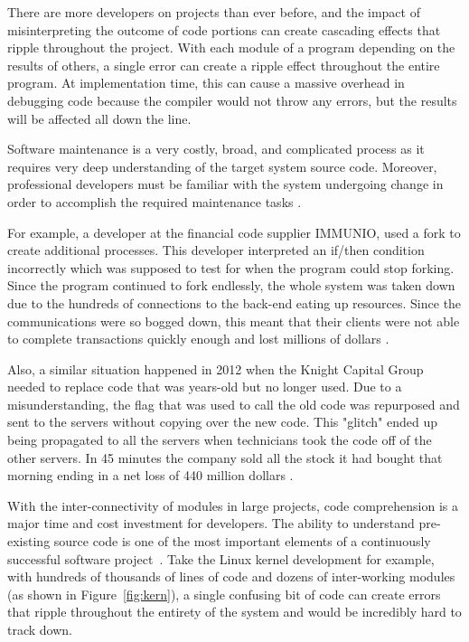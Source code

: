 There are more developers on projects than ever before, and the impact of 
misinterpreting the outcome of code portions can create cascading effects that ripple throughout the project.  With
each module of a program depending on the results of others, a single error can create a ripple effect throughout the entire program.
At implementation time, this can cause a massive overhead in debugging code because the compiler would not 
throw any errors, but the results will be affected all down the line.

Software maintenance is a very costly, broad, and complicated process 
as it requires very deep understanding of the target system source 
code. Moreover, professional
developers must be familiar with the system undergoing change in order to accomplish
the required maintenance tasks \cite{alhindawi_degree_nodate}.

For example, a developer at the financial code supplier IMMUNIO, used a fork to create additional
processes. This developer interpreted an if/then condition incorrectly which was supposed to test for when
the program could stop forking. Since the program continued to fork endlessly, the whole system was taken
down due to the hundreds of connections to the back-end eating up resources. Since the communications were
so bogged down, this meant that their clients were not able to complete transactions quickly enough and
lost millions of dollars \cite{sherman_21_nodate}. 

Also, a similar situation happened in 2012 when the Knight Capital Group needed to replace code that was
years-old but no longer used. Due to a misunderstanding, the flag that was used to call the old code was 
repurposed and sent to the servers without copying over the new code. This "glitch" ended up being
propagated to all the servers when technicians took the code off of the other servers. In 45 minutes the
company sold all the stock it had bought that morning ending in a net loss of 440 million dollars
\cite{sherman_21_nodate}.

With the inter-connectivity of modules in large projects, code comprehension is a major time and cost investment for 
developers. The ability to understand
pre-existing source code is one of the most important elements 
of a continuously successful software
project~\cite{gopstein_understanding_2017}. Take the Linux kernel 
development for example, with hundreds of thousands of lines of 
code and dozens of inter-working modules (as shown in 
 Figure~\ref{fig:kern}), a single confusing bit of 
code can create errors that ripple throughout the entirety of 
the system and would be incredibly hard to track down. 

